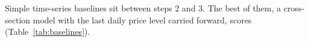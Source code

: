 Simple time-series baselines sit between steps 2 and 3. The best of them, a cross-section model with the last
daily price level carried forward, scores \usd{\DevNaiveIndex} (Table~\ref{tab:baselines}).

\begin{table}[H]
  \caption{Baselines on the development folds.}\label{tab:baselines}
\end{table}

\begin{table}[H]
  \caption{Paired 7-day block-bootstrap comparisons on the development folds (final minus other model;
  negative means the final model is better).}\label{tab:devci}
\end{table}
